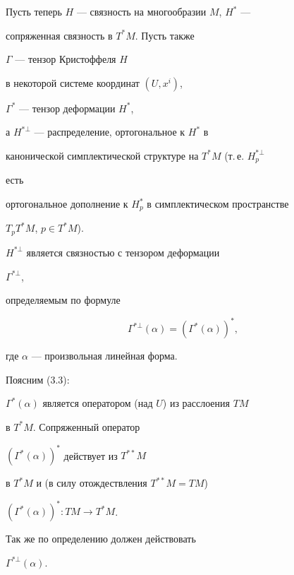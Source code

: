 Пусть теперь $H$ --- связность на многообразии $M$, $H^*$ --- 


сопряженная связность в $T^*M$. Пусть также 


$\Gamma$ --- тензор Кристоффеля $H$ 


в некоторой системе координат $(U,x^i)$, 


$\Gamma^*$ --- тензор деформации $H^*$, 


а $H^{*\bot}$ --- распределение, ортогональное к $H^*$ в 


канонической симплектической структуре на $T^*M$ (т.\,е. $H^{*\bot}_p$ 


есть 


ортогональное дополнение к $H^*_p$ в симплектическом пространстве 


$T_p T^*M$, $p\in T^*M$). 


 


\begin{thms} $H^{*\bot}$ является связностью с тензором деформации 


$\Gamma^{*\bot}$, 


определяемым по формуле 


\begin{equation} 


\Gamma^{*\bot}(\alpha)=(\Gamma^*(\alpha))^*, 


\end{equation} 


где $\alpha$ --- произвольная линейная форма. 


\end{thms} 


 


Поясним (3.3): 


$\Gamma^*(\alpha)$ является оператором (над $U$) из расслоения $TM$ 


в $T^*M$. Сопряженный оператор 


$(\Gamma^*(\alpha))^*$ действует из $T^{**}M$ 


в $T^*M$ и (в силу отождествления $T^{**}M=TM$)\; 


$(\Gamma^*(\alpha))^*:TM\to T^*M$. 


Так же по определению должен действовать 


$\Gamma^{*\bot}(\alpha)$. 


 


